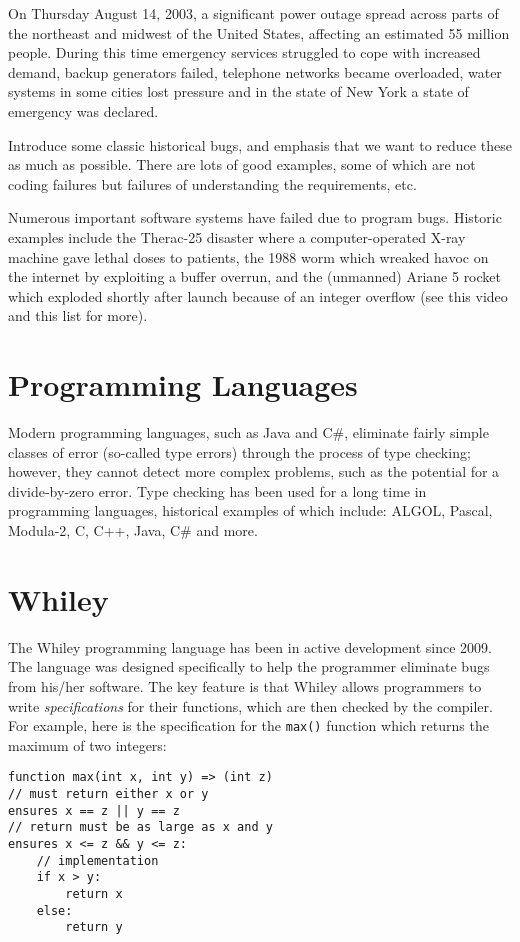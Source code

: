 On Thursday August 14, 2003, a significant power outage spread across parts of the northeast and midwest of the United States, affecting an estimated 55 million people.  During this time emergency services struggled to cope with increased demand, backup generators failed, telephone networks became overloaded, water systems in some cities lost pressure and in the state of New York a state of emergency was declared.

Introduce some classic historical bugs, and emphasis that we want to reduce these as much as possible.  There are lots of good examples, some of which are not coding failures but failures of understanding the requirements, etc.

Numerous important software systems have failed due to program bugs. Historic examples include the Therac-25 disaster where a computer-operated X-ray machine gave lethal doses to patients, the 1988 worm which wreaked havoc on the internet by exploiting a buffer overrun, and the (unmanned) Ariane 5 rocket which exploded shortly after launch because of an integer overflow (see this video and this list for more).

\section{Programming Languages}

Modern programming languages, such as Java and C\#, eliminate fairly simple classes of error (so-called type errors) through the process of type checking; however, they cannot detect more complex problems, such as the potential for a divide-by-zero error. Type checking has been used for a long time in programming languages, historical examples of which include: ALGOL, Pascal, Modula-2, C, C++, Java, C\# and more.

\section{Whiley}
The Whiley programming language has been in active development since
2009.  The language was designed specifically to help the programmer
eliminate bugs from his/her software.  The key feature is that Whiley
allows programmers to write {\em specifications} for their functions,
which are then checked by the compiler.  For example, here is the
specification for the \lstinline{max()} function which returns the
maximum of two integers:

\begin{lstlisting}
function max(int x, int y) => (int z)
// must return either x or y
ensures x == z || y == z
// return must be as large as x and y
ensures x <= z && y <= z:
    // implementation
    if x > y:
        return x
    else:
        return y
\end{lstlisting}

